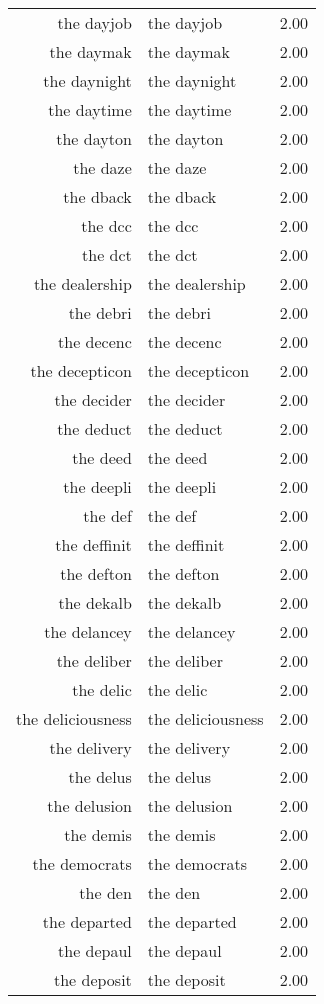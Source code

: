 \begin{table}[ht]
\begin{tabular}{rlr}
  the dayjob & the dayjob & 2.00 \\ 
  the daymak & the daymak & 2.00 \\ 
  the daynight & the daynight & 2.00 \\ 
  the daytime & the daytime & 2.00 \\ 
  the dayton & the dayton & 2.00 \\ 
  the daze & the daze & 2.00 \\ 
  the dback & the dback & 2.00 \\ 
  the dcc & the dcc & 2.00 \\ 
  the dct & the dct & 2.00 \\ 
  the dealership & the dealership & 2.00 \\ 
  the debri & the debri & 2.00 \\ 
  the decenc & the decenc & 2.00 \\ 
  the decepticon & the decepticon & 2.00 \\ 
  the decider & the decider & 2.00 \\ 
  the deduct & the deduct & 2.00 \\ 
  the deed & the deed & 2.00 \\ 
  the deepli & the deepli & 2.00 \\ 
  the def & the def & 2.00 \\ 
  the deffinit & the deffinit & 2.00 \\ 
  the defton & the defton & 2.00 \\ 
  the dekalb & the dekalb & 2.00 \\ 
  the delancey & the delancey & 2.00 \\ 
  the deliber & the deliber & 2.00 \\ 
  the delic & the delic & 2.00 \\ 
  the deliciousness & the deliciousness & 2.00 \\ 
  the delivery & the delivery & 2.00 \\ 
  the delus & the delus & 2.00 \\ 
  the delusion & the delusion & 2.00 \\ 
  the demis & the demis & 2.00 \\ 
  the democrats & the democrats & 2.00 \\ 
  the den & the den & 2.00 \\ 
  the departed & the departed & 2.00 \\ 
  the depaul & the depaul & 2.00 \\ 
  the deposit & the deposit & 2.00 \\ 

\end{tabular}
\end{table}
